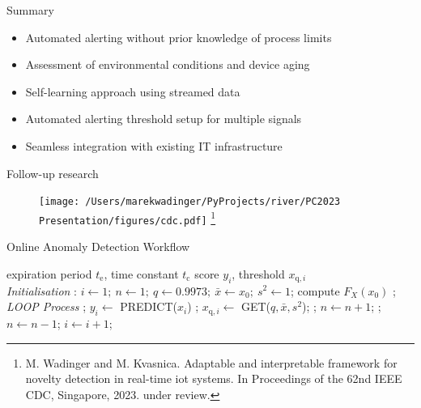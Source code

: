 \documentclass[aspectratio=169]{beamer}
\newcommand{\ui}[2]{#1 _{\mathrm{#2}}}
\newcommand{\uis}[3]{#1 _{\mathrm{#2}, #3}}
\begin{document}
\begin{frame}{Summary}
    \begin{itemize}
        \item Automated alerting without prior knowledge of process limits
        \item Assessment of environmental conditions and device aging
        \item Self-learning approach using streamed data
        \item Automated alerting threshold setup for multiple signals
        \item Seamless integration with existing IT infrastructure
    \end{itemize}
\end{frame}

\begin{frame}{Follow-up research}
    \begin{figure}[htpb]
        \begin{center}
            \texttt{[image: /Users/marekwadinger/PyProjects/river/PC2023 Presentation/figures/cdc.pdf]}
            \footnote{\tiny M. Wadinger and M. Kvasnica. Adaptable and interpretable framework for novelty detection in real-time iot systems. In Proceedings of the 62nd IEEE CDC, Singapore, 2023. under review.}
        \end{center}
    \end{figure}
\end{frame}

\begin{frame}{Online Anomaly Detection Workflow}
    \begin{algorithmic}[1]
        \scriptsize
        \renewcommand{\algorithmicrequire}{\textbf{Input:}}
        \renewcommand{\algorithmicensure}{\textbf{Output:}}
        \REQUIRE expiration period $\ui{t}{e}$, time constant $\ui{t}{c}$
        \ENSURE  score $y_i$, threshold $\uis{x}{q}{i}$
        \\ \textit{Initialisation} :
        \STATE $i \leftarrow 1;~ n \leftarrow 1;~ q \leftarrow 0.9973;~ \bar x  \leftarrow x_0;~  s^2 \leftarrow 1$;
        \STATE compute $F_X(x_0)$ ;
        \\ \textit{LOOP Process}
        \LOOP
        ;
        \STATE $y_i \leftarrow$ PREDICT($x_i$) ;
        \STATE $\uis{x}{q}{i} \leftarrow$ GET($q, \bar x, s^2$);
        \IF {\eqref{case:normal} \OR \eqref{eq:update}}
        ;
        \STATE $n \leftarrow n + 1$;
        \FOR {$x_{i-\ui{t}{e}}$}
        \STATE {$\bar x$, $s^2 \leftarrow$ REVERT($x_{i-\ui{t}{e}}, \bar x, s^2, n$)};
        \STATE $n \leftarrow n - 1$;
        \ENDFOR
        \ENDIF
        \STATE $i \leftarrow i + 1$;
        \ENDLOOP
    \end{algorithmic}
\end{frame}
\end{document}
